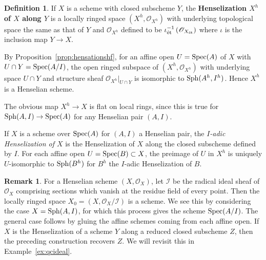 \documentclass[12pt]{article}
\renewcommand{\O}{\mathscr{O}}
\newcommand{\spec}{{\rm Spec}}
\newcommand{\sph}{{\rm Sph}}
\newcommand{\mc}[1]{\mathcal{#1}}
\newcommand{\et}{{\rm\acute{e}t}}
\theoremstyle{definition}
\newtheorem{definition}[theorem]{Definition}
\newtheorem{remark}[theorem]{Remark}
\numberwithin{equation}{subsection}
\begin{document}
\begin{definition}\label{def:hensationsch}
If $X$ is a scheme with closed subscheme $Y$, the {\bf Henselization $X^h$ of $X$ along $Y$} is a locally ringed space $(X^h,\O_{X^h})$ with underlying topological space the same as that of $Y$ and $\O_{X^h}$ defined to be $\iota_{\et}^{-1}\left(\O_{X_{\et}}\right)$ where $\iota$ is the inclusion map $Y \to X$. 

By Proposition~\ref{prop:hensationshf}, for an affine open $U=\spec(A)$ of $X$ with $U \cap Y =\spec(A/I)$, the open ringed subspace of $(X^h,\O_{X^h})$ with underlying space $U \cap Y$ and structure sheaf $\O_{X^h}|_{U \cap Y}$ is isomorphic to $\sph(A^h,I^h)$. Hence $X^h$ is a Henselian scheme.

The obvious map $X^h \to X$ is flat on local rings, since this is true for $\sph(A,I) \to \spec(A)$ for any Henselian pair $(A,I)$.
 
If $X$ is a scheme over $\spec(A)$ for $(A,I)$ a Henselian pair, the {\it $I$-adic Henselization of $X$} is the Henselization of $X$ along the closed subscheme defined by $I$. For each affine open $U = \spec(B) \subset X$, the preimage of $U$ in $X^h$ is uniquely $U$-isomorphic to $\sph(B^h)$ for $B^h$ the $I$-adic Henselization of $B$. 
\end{definition}

\begin{remark}\label{rmk:getususch}
For a Henselian scheme $(X,\O_X)$, let $\mc{I}$ be the radical ideal sheaf of $\O_X$ comprising sections which vanish at the residue field of every point. Then the locally ringed space $X_0=(X,\O_X/\mc{I})$ is a scheme. We see this by considering the case $X=\sph(A,I)$, for which this process gives the scheme $\spec(A/I)$.  The general case follows by gluing the affine schemes coming from each affine open. If $X$ is the Henselization of a scheme $Y$ along a reduced closed subscheme $Z$, then the preceding construction recovers $Z$. We will revisit this in Example~\ref{ex:qcideal}. 
\end{remark}
\end{document}
